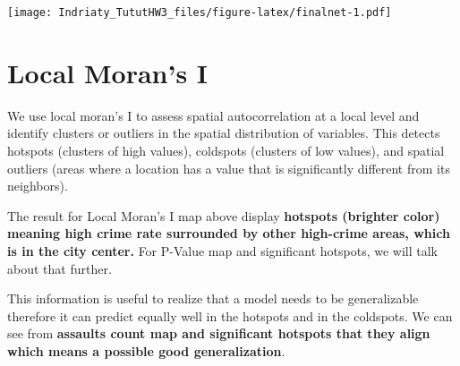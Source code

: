 \documentclass[
]{article}
\begin{document}
\texttt{[image: Indriaty\_TututHW3\_files/figure-latex/finalnet-1.pdf]}

\section{Local Moran's I}\label{local-morans-i}

We use local moran's I to assess spatial autocorrelation at a local
level and identify clusters or outliers in the spatial distribution of
variables. This detects hotspots (clusters of high values), coldspots
(clusters of low values), and spatial outliers (areas where a location
has a value that is significantly different from its neighbors).

The result for Local Moran's I map above display \textbf{hotspots
(brighter color) meaning high crime rate surrounded by other high-crime
areas, which is in the city center.} For P-Value map and significant
hotspots, we will talk about that further.

This information is useful to realize that a model needs to be
generalizable therefore it can predict equally well in the hotspots and
in the coldspots. We can see from \textbf{assaults count map and
significant hotspots that they align which means a possible good
generalization}.
\end{document}
